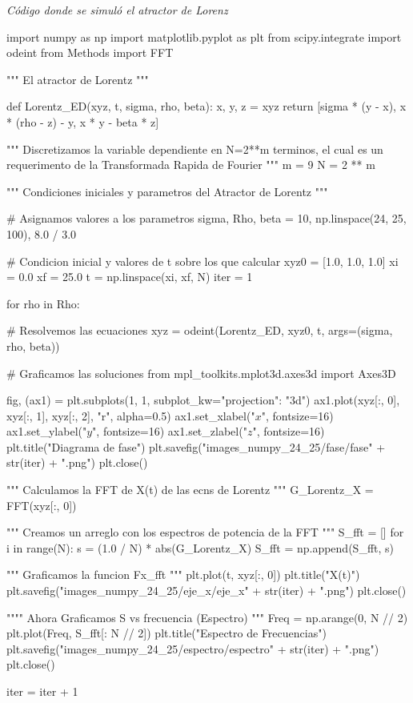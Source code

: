 \emph{Código donde se simuló el atractor de Lorenz}

\begin{python}
    import numpy as np
    import matplotlib.pyplot as plt
    from scipy.integrate import odeint
    from Methods import FFT

    """
    El atractor de Lorentz
    """


    def Lorentz_ED(xyz, t, sigma, rho, beta):
    x, y, z = xyz
    return [sigma * (y - x), x * (rho - z) - y, x * y - beta * z]


    """
    Discretizamos la variable dependiente en N=2**m terminos,
    el cual es un requerimento de la Transformada Rapida de Fourier
    """
    m = 9
    N = 2 ** m


    """
    Condiciones iniciales y parametros del Atractor de Lorentz
    """

    # Asignamos valores a los parametros
    sigma, Rho, beta = 10, np.linspace(24, 25, 100), 8.0 / 3.0

    # Condicion inicial y valores de t sobre los que calcular
    xyz0 = [1.0, 1.0, 1.0]
    xi = 0.0
    xf = 25.0
    t = np.linspace(xi, xf, N)
    iter = 1

    for rho in Rho:

    # Resolvemos las ecuaciones
    xyz = odeint(Lorentz_ED, xyz0, t, args=(sigma, rho, beta))

    # Graficamos las soluciones
    from mpl_toolkits.mplot3d.axes3d import Axes3D

    fig, (ax1) = plt.subplots(1, 1, subplot_kw={"projection": "3d"})
    ax1.plot(xyz[:, 0], xyz[:, 1], xyz[:, 2], "r", alpha=0.5)
    ax1.set_xlabel("$x$", fontsize=16)
    ax1.set_ylabel("$y$", fontsize=16)
    ax1.set_zlabel("$z$", fontsize=16)
    plt.title("Diagrama de fase")
    plt.savefig("images_numpy_24_25/fase/fase" + str(iter) + ".png")
    plt.close()

    """
    Calculamos la FFT de X(t) de las ecns de Lorentz
    """
    G_Lorentz_X = FFT(xyz[:, 0])

    """
    Creamos un arreglo con los espectros de potencia de la FFT
    """
    S_fft = []
    for i in range(N):
    s = (1.0 / N) * abs(G_Lorentz_X)
    S_fft = np.append(S_fft, s)

    """
    Graficamos la funcion Fx_fft
    """
    plt.plot(t, xyz[:, 0])
    plt.title("X(t)")
    plt.savefig("images_numpy_24_25/eje_x/eje_x" + str(iter) + ".png")
    plt.close()

    """"
    Ahora Graficamos S vs frecuencia (Espectro)
    """
    Freq = np.arange(0, N // 2)
    plt.plot(Freq, S_fft[: N // 2])
    plt.title("Espectro de Frecuencias")
    plt.savefig("images_numpy_24_25/espectro/espectro" + str(iter) + ".png")
    plt.close()

    iter = iter + 1
\end{python}

